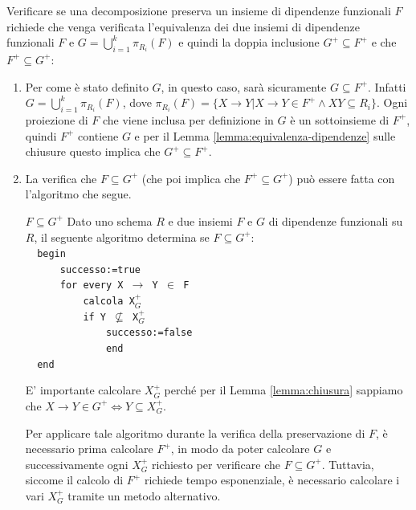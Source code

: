 Verificare se una decomposizione preserva un insieme di dipendenze funzionali $F$ richiede che venga verificata l'equivalenza dei due insiemi di dipendenze funzionali $F$ e $G=\bigcup^k_{i=1}\pi_{R_i}(F)$ e quindi la doppia inclusione $G^+\subseteq F^+$ e che $F^+\subseteq G^+$:
\begin{enumerate}
    \item Per come è stato definito $G$, in questo caso, sarà sicuramente $G\subseteq F^+$. Infatti $G=\bigcup^k_{i=1}\pi_{R_i}(F)$, dove $\pi_{R_i}(F)=\{X\to Y|X\to Y\in F^+\land XY\subseteq R_i\}$. Ogni proiezione di $F$ che viene inclusa per definizione in $G$ è un sottoinsieme di $F^+$, quindi $F^+$ contiene $G$ e per il Lemma \ref{lemma:equivalenza-dipendenze} sulle chiusure questo implica che $G^+\subseteq F^+$.

    \item La verifica che $F\subseteq G^+$ (che poi implica che $F^+\subseteq G^+$) può essere fatta con l'algoritmo che segue.

    \begin{Algoritmo}{$F\subseteq G^+$}{}
        Dato uno schema $R$ e due insiemi $F$ e $G$ di dipendenze funzionali su $R$, il seguente algoritmo determina se $F\subseteq G^+$:\\
        \verb|  begin|\\
        \verb|      successo:=true|\\
        \verb|      for every X |$\to$\verb| Y |$\in$\verb| F|\\
        \verb|          calcola X|$^+_G$\\
        \verb|          if Y |$\not\subseteq$\verb| X|$^+_G$\\
        \verb|              successo:=false|\\
        \verb|              end|\\
        \verb|  end|

        E' importante calcolare $X^+_G$ perché per il Lemma \ref{lemma:chiusura} sappiamo che $X\to Y\in G^+\iff Y\subseteq X^+_G$.
    \end{Algoritmo}
    Per applicare tale algoritmo durante la verifica della preservazione di $F$, è necessario prima calcolare $F^+$, in modo da poter calcolare $G$ e successivamente ogni $X^+_G$ richiesto per verificare che $F\subseteq G^+$. Tuttavia, siccome il calcolo di $F^+$ richiede tempo esponenziale, è necessario calcolare i vari $X^+_G$ tramite un metodo alternativo.


\end{enumerate}
